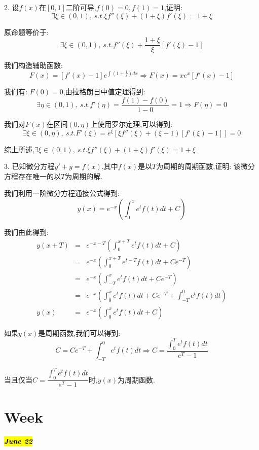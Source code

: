 
2. 设$f(x)$在$[0,1]$二阶可导,$f(0)=0,f(1)=1$,证明: $$\exists \xi\in(0,1),\ s.t. \xi f''(\xi)+(1+\xi)f'(\xi)=1+\xi$$
\begin{solution}
	
	原命题等价于: 
	$$\exists \xi\in(0,1),\ s.t. f''(\xi)+\dfrac{1+\xi}{\xi}[f'(\xi)-1]$$
	
	我们构造辅助函数: 
	$$F(x)=[f'(x)-1]e^{\int(1+\frac{1}{x})dx}\Rightarrow F(x)=xe^x[f'(x)-1]$$
	
	我们有: $F(0)=0$,由拉格朗日中值定理得到: 
	$$\exists \eta\in(0,1),\ s.t. f'(\eta)=\dfrac{f(1)-f(0)}{1-0}=1\Rightarrow F(\eta)=0$$
	
	我们对$F(x)$在区间$(0,\eta)$上使用罗尔定理,可以得到: 
	$$\exists \xi\in(0,\eta),\ s.t. F'(\xi)=e^{\xi}[\xi f''(\xi)+(\xi+1)[f'(\xi)-1]]=0$$
	
	综上所述,$\exists \xi\in(0,1),\ s.t. \xi f''(\xi)+(1+\xi)f'(\xi)=1+\xi$
\end{solution}


3. 已知微分方程$y'+y=f(x)$,其中$f(x)$是以$T$为周期的周期函数,证明: 该微分方程存在唯一的以$T$为周期的解.
\begin{solution}
	
	我们利用一阶微分方程通接公式得到: 
	$$y(x)=e^{-x}(\int_{0}^{x}e^tf(t)dt+C)$$
	
	我们由此得到: 
	\begin{eqnarray*}
		y(x+T)&=&e^{-x-T}(\int_{0}^{x+T}e^tf(t)dt+C)\\
		&=&e^{-x}(\int_{0}^{x+T}e^{t-T}f(t)dt+Ce^{-T})\\
		&=&e^{-x}(\int_{-T}^{x}e^{t}f(t)dt+Ce^{-T})\\
		&=&e^{-x}(\int_{0}^{x}e^{t}f(t)dt+Ce^{-T}+\int_{-T}^{0}e^{t}f(t)dt)\\
		y(x)&=&e^{-x}(\int_{0}^{x}e^tf(t)dt+C)
	\end{eqnarray*}
	
	如果$y(x)$是周期函数,我们可以得到: 
	$$C=Ce^{-T}+\int_{-T}^{0}e^{t}f(t)dt\Rightarrow C=\dfrac{\int_{0}^{T}e^{t}f(t)dt}{e^{T}-1}$$
	
	当且仅当$C=\dfrac{\int_{0}^{T}e^{t}f(t)dt}{e^{T}-1}$时,$y(x)$为周期函数.
\end{solution}


\section{Week }
\hl{\textbf{\textit{June 22}}}

